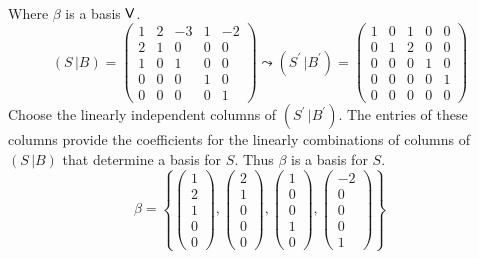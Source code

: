 \begin{enumerate}
\paragraph{} Where $\beta$ is a basis $\mathsf{V}$.
\begin{equation}
(S\, | B )
=
\begin{pmatrix}
1 & 2 & -3 & 1 & -2 \\
2 & 1 & 0 & 0 & 0 \\
1 & 0 & 1 & 0 & 0 \\
0 & 0 & 0 & 1 & 0 \\
0 & 0 & 0 & 0 & 1
\end{pmatrix}
\leadsto (S^\prime \,| B^\prime) = 
\begin{pmatrix}
1 & 0 & 1 & 0 & 0\\
0 & 1 & 2 & 0 & 0\\
0 & 0 & 0 & 1 & 0\\
0 & 0 & 0 & 0 & 1\\
0 & 0 & 0 & 0 & 0
\end{pmatrix}
\end{equation}
Choose the linearly independent columns of $(S^\prime \,|
B^\prime)$. The entries of these columns provide the coefficients for
the linearly combinations of columns of $(S\, | B )$ that determine a
basis for $S$. Thus $\beta$ is a basis for $S$.
\begin{equation}
\beta = \left\{\begin{pmatrix}1\\2\\1\\0\\0\end{pmatrix},\begin{pmatrix}2\\1\\0\\0\\0\end{pmatrix},\begin{pmatrix}1\\0\\0\\1\\0\end{pmatrix},\begin{pmatrix}-2\\0\\0\\0\\1\end{pmatrix}\right\}
\end{equation}
\end{enumerate}
